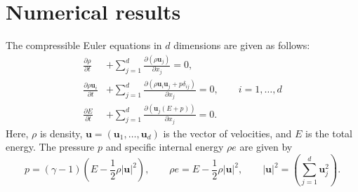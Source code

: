 \documentclass[onefignum,onetabnum,final]{siamart171218}
\newcommand{\pd}[2]{\frac{\partial#1}{\partial#2}}
\newcommand{\LRp}[1]{\left( #1 \right)}
\newcommand{\LRb}[1]{\left| #1 \right|}
\begin{document}
\section{Numerical results}
\label{sec:3}
The compressible Euler equations in $d$ dimensions are given as follows:
\begin{align*}
\pd{\rho}{t} &+ \sum_{j=1}^d \pd{\LRp{\rho \bm{u}_j}}{x_j} = 0,\\
\pd{\rho \bm{u}_i}{t} &+ \sum_{j=1}^d \pd{\LRp{\rho \bm{u}_i\bm{u}_j + p\delta_{ij} }}{x_j} = 0, \qquad i = 1,\ldots,d\\
\pd{E}{t} &+ \sum_{j=1}^d \pd{\LRp{\bm{u}_j(E+p)}}{x_j} = 0.\nonumber
\end{align*}
Here, $\rho$ is density, $\bm{u} = \LRp{\bm{u}_1, \ldots,\bm{u}_d}$ is the vector of velocities, and $E$ is the total energy.  The pressure $p$ and specific internal energy $\rho e$ are given by 
\[
p = (\gamma-1)\LRp{E - \frac{1}{2}\rho \LRb{\bm{u}}^2}, \qquad \rho e = E - \frac{1}{2}\rho \LRb{\bm{u}}^2, \qquad \LRb{\bm{u}}^2 = \LRp{\sum_{j=1}^d \bm{u}_j^2}.
\]
\end{document}
